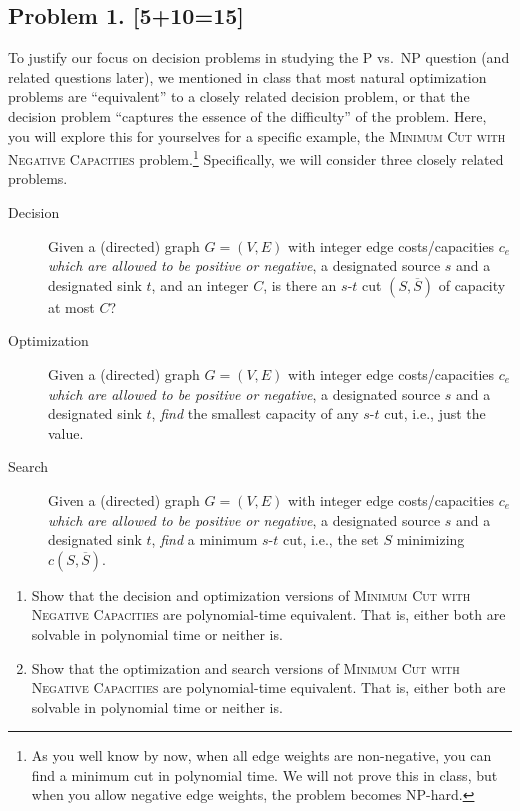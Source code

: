 \documentclass[10pt]{article}
\providecommand{\Compl}[1]{\overline{#1}}
\begin{document}
\newpage

\subsection*{Problem 1. [5+10=15]}
To justify our focus on decision problems in studying the P vs.~NP question (and related questions later), we mentioned in class that most natural optimization problems are ``equivalent'' to a closely related decision problem, or that the decision problem ``captures the essence of the difficulty'' of the problem. Here, you will explore this for yourselves for a specific example, the \textsc{Minimum Cut with Negative Capacities} problem.\footnote{As you well know by now, when all edge weights are non-negative, you can find a minimum cut in polynomial time. We will not prove this in class, but when you allow negative edge weights, the problem becomes NP-hard.} Specifically, we will consider three closely related problems.
\begin{description}
\item[Decision] Given a (directed) graph $G=(V,E)$ with integer edge costs/capacities $c_e$ \emph{which are allowed to be positive or negative}, a designated source $s$ and a designated sink $t$, and an integer $C$, is there an $s$-$t$ cut $(S, \Compl{S})$ of capacity at most $C$?
\item[Optimization] Given a (directed) graph $G=(V,E)$ with integer edge costs/capacities $c_e$ \emph{which are allowed to be positive or negative}, a designated source $s$ and a designated sink $t$, \emph{find} the smallest capacity of any $s$-$t$ cut, i.e., just the value.
\item[Search] Given a (directed) graph $G=(V,E)$ with integer edge costs/capacities $c_e$ \emph{which are allowed to be positive or negative}, a designated source $s$ and a designated sink $t$, \emph{find} a minimum $s$-$t$ cut, i.e., the set $S$ minimizing $c(S, \Compl{S})$. 
\end{description}

\begin{enumerate}
\item Show that the decision and optimization versions of \textsc{Minimum Cut with Negative Capacities} are polynomial-time equivalent. That is, either both are solvable in polynomial time or neither is.
\item Show that the optimization and search versions of \textsc{Minimum Cut with Negative Capacities} are polynomial-time equivalent. That is, either both are solvable in polynomial time or neither is.
\end{enumerate}
\end{document}
